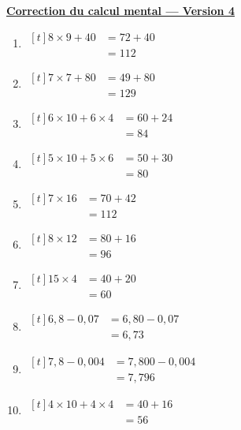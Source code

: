 \documentclass[12pt,a4paper]{article}
\newcommand{\titreversion}[1]{%
  \begin{center}%
    {\Large\underline{\textbf{#1}}}%
  \end{center}%
}
\begin{document}
\titreversion{Correction du calcul mental --- Version 4}
\begin{enumerate}
\item {$\begin{aligned}[t]
8\times 9+40 &= 72+40\\
             &= \boxed{112}
\end{aligned}$}
\item {$\begin{aligned}[t]
7\times 7+80 &= 49+80\\
             &= \boxed{129}
\end{aligned}$}
\item {$\begin{aligned}[t]
6\times 10+6\times 4 &= 60+24\\
                     &= \boxed{84}
\end{aligned}$}
\item {$\begin{aligned}[t]
5\times 10+5\times 6 &= 50+30\\
                     &= \boxed{80}
\end{aligned}$}
\item {$\begin{aligned}[t]
7\times 16 &= 70+42\\
           &= \boxed{112}
\end{aligned}$}
\item {$\begin{aligned}[t]
8\times 12 &= 80+16\\
           &= \boxed{96}
\end{aligned}$}
\item {$\begin{aligned}[t]
15\times 4 &= 40+20\\
           &= \boxed{60}
\end{aligned}$}
\item {$\begin{aligned}[t]
6{,}8-0{,}07 &= 6{,}80-0{,}07\\
             &= \boxed{6{,}73}
\end{aligned}$}
\item {$\begin{aligned}[t]
7{,}8-0{,}004 &= 7{,}800-0{,}004\\
              &= \boxed{7{,}796}
\end{aligned}$}
\item {$\begin{aligned}[t]
4\times 10+4\times 4 &= 40+16\\
                     &= \boxed{56}
\end{aligned}$}
\end{enumerate}
\newpage
\end{document}
